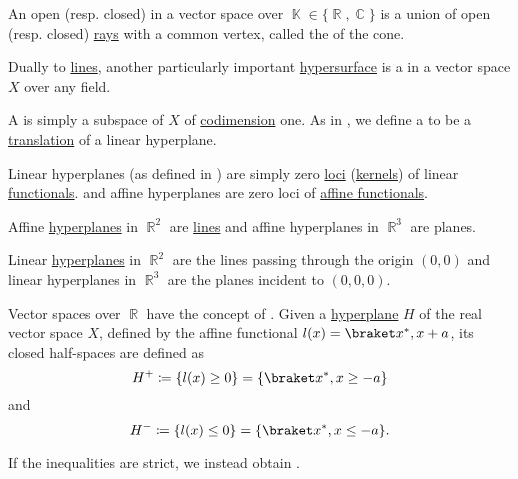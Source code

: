 \begin{definition}\label{def:geometric_cone}
  An open (resp. closed)  in a vector space over \( \BbbK \in \{ \BbbR, \BbbC \} \) is a union of open (resp. closed) \hyperref[def:geometric_ray]{rays} with a common vertex, called the  of the cone.
\end{definition}

\begin{definition}\label{def:hyperplane}
  Dually to \hyperref[def:geometric_line]{lines}, another particularly important \hyperref[def:hypersurface]{hypersurface} is a  in a vector space \( X \) over any field.

  \begin{defenum}
     A  is simply a subspace of \( X \) of \hyperref[def:vector_space_dimension]{codimension} one. As in , we define a  to be a \hyperref[def:euclidean_transformation/translation]{translation} of a linear hyperplane.

     Linear hyperplanes (as defined in ) are simply zero \hyperref[def:zero_locus]{loci} (\hyperref[def:semiring_kernel]{kernels}) of linear \hyperref[def:linear_operator]{functionals}. and affine hyperplanes are zero loci of \hyperref[def:affine_operator]{affine functionals}.
  \end{defenum}
\end{definition}

\begin{example}\label{ex:hyperplanes}
  Affine \hyperref[def:hyperplane]{hyperplanes} in \( \BbbR^2 \) are \hyperref[def:geometric_line]{lines} and affine hyperplanes in \( \BbbR^3 \) are planes.

  Linear \hyperref[def:hyperplane]{hyperplanes} in \( \BbbR^2 \) are the lines passing through the origin \( (0, 0) \) and linear hyperplanes in \( \BbbR^3 \) are the planes incident to \( (0, 0, 0) \).
\end{example}

\begin{definition}\label{def:half_space}
  Vector spaces over \( \BbbR \) have the concept of . Given a \hyperref[def:hyperplane]{hyperplane} \( H \) of the real vector space \( X \), defined by the affine functional \( l(x) = \inner {x^*} x + a \), its closed half-spaces are defined as
  \begin{equation*}
    H^+ \coloneqq \{ l(x) \geq 0 \} = \{ \inner {x^*} x \geq -a \}
  \end{equation*}
  and
  \begin{equation*}
    H^- \coloneqq \{ l(x) \leq 0 \} = \{ \inner {x^*} x \leq -a \}.
  \end{equation*}

  If the inequalities are strict, we instead obtain .
\end{definition}

